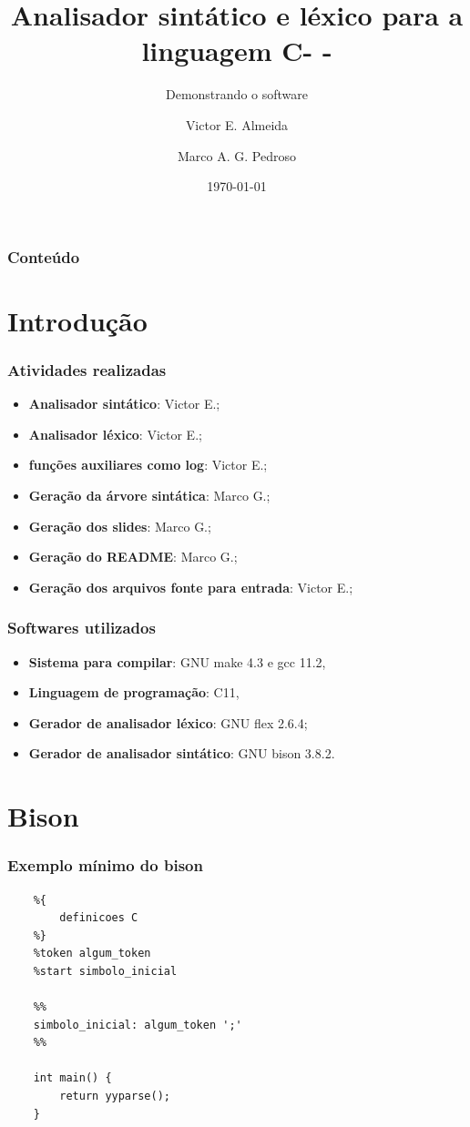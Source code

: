 \documentclass[12pt]{beamer}
\author[Grupo: c--]{Victor E. Almeida \and Marco A. G. Pedroso}
\title{Analisador sintático e léxico para a linguagem C- -}
\subtitle{Demonstrando o software}
\date{\today}
\institute{UNIOESTE}
\begin{document}
\frame{\titlepage}

\begin{frame}
\frametitle{Conteúdo}
\tableofcontents
\end{frame}

\section{Introdução}\label{Introdução}
\begin{frame}
    \frametitle{Atividades realizadas}
    \begin{itemize}
        \item\textbf{Analisador sintático}: Victor E.;
        \item\textbf{Analisador léxico}: Victor E.;
        \item\textbf{funções auxiliares como log}: Victor E.;
        \item\textbf{Geração da árvore sintática}: Marco G.;
        \item\textbf{Geração dos slides}: Marco G.;
        \item\textbf{Geração do README}: Marco G.;
        \item\textbf{Geração dos arquivos fonte para entrada}: Victor E.;
    \end{itemize}
\end{frame}
\begin{frame}
    \frametitle{Softwares utilizados}
    \begin{itemize}
        \item \textbf{Sistema para compilar}: GNU make 4.3 e gcc 11.2,
        \item \textbf{Linguagem de programação}: C11,
        \item \textbf{Gerador de analisador léxico}: GNU flex 2.6.4;
        \item \textbf{Gerador de analisador sintático}: GNU bison 3.8.2.
    \end{itemize}
\end{frame}


\section{Bison}\label{Bison}
\begin{frame}[t,fragile]{\insertsectionhead}
    \frametitle{Exemplo mínimo do bison}
    \begin{lstlisting}
    %{
        definicoes C
    %}
    %token algum_token
    %start simbolo_inicial

    %%
    simbolo_inicial: algum_token ';'
    %%

    int main() {
        return yyparse();
    }
    \end{lstlisting}
\end{frame}
\end{document}
